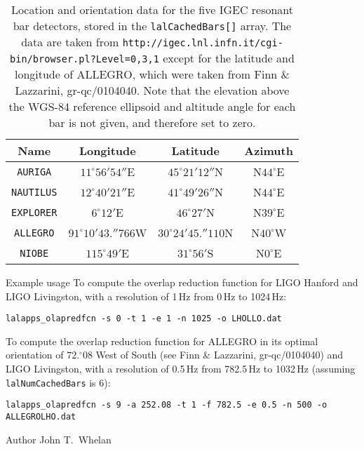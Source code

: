 \begin{entry}
\begin{table}[tbp]
  \begin{center}
    \begin{tabular}{|c|c|c|c|}
\hline
      Name & Longitude & Latitude & Azimuth
\\ \hline
\verb$AURIGA$ & $11^\circ56'54''$E & $45^\circ21'12''$N & N$44^\circ$E 
\\ \hline
\verb$NAUTILUS$ & $12^\circ40'21''$E & $41^\circ49'26''$N & N$44^\circ$E 
\\ \hline
\verb$EXPLORER$ & $6^\circ12'$E & $46^\circ27'$N & N$39^\circ$E 
\\ \hline
\verb$ALLEGRO$ & $91^\circ10'43.\!\!''766$W & $30^\circ24'45.\!\!''110$N 
& N$40^\circ$W
\\ \hline
\verb$NIOBE$ & $115^\circ49'$E & $31^\circ56'$S & N$0^\circ$E 
\\ \hline
    \end{tabular}
    \caption{Location and orientation data for the five IGEC resonant
      bar detectors, stored in the \texttt{lalCachedBars[]}
      array.  The data are taken from
      \texttt{http://igec.lnl.infn.it/cgi-bin/browser.pl?Level=0,3,1}
      except for the latitude and longitude of ALLEGRO, which were
      taken from Finn \& Lazzarini, gr-qc/0104040.  Note that the
      elevation above the WGS-84 reference ellipsoid and altitude
      angle for each bar is not given, and therefore set to zero.}
    \label{table:cachedBars}
  \end{center}
\end{table}


\item[Example usage]
  To compute the overlap reduction function for LIGO Hanford and
  LIGO Livingston, with a resolution of 1\,Hz from 0\,Hz to 1024\,Hz:
\begin{verbatim}
lalapps_olapredfcn -s 0 -t 1 -e 1 -n 1025 -o LHOLLO.dat
\end{verbatim}
  
  To compute the overlap reduction function for ALLEGRO in its optimal
  orientation of $72.\!\!^\circ08$ West of South (see Finn \& Lazzarini,
  gr-qc/0104040) and LIGO Livingston, with a resolution of 0.5\,Hz from
  782.5\,Hz to 1032\,Hz (assuming \texttt{lalNumCachedBars} is 6):
\begin{verbatim}
lalapps_olapredfcn -s 9 -a 252.08 -t 1 -f 782.5 -e 0.5 -n 500 -o ALLEGROLHO.dat
\end{verbatim}

\item[Author]
John T.~Whelan

\end{entry}
